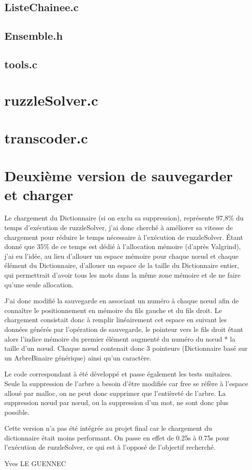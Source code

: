     \subsection{ListeChainee.c}
    \subsection{Ensemble.h}
    \subsection{tools.c}

  \section{ruzzleSolver.c}
  \section{transcoder.c}

\section{Deuxième version de sauvegarder et charger}
  Le chargement du Dictionnaire (si on exclu sa suppression), représente 97,8\%
  du temps d'exécution de ruzzleSolver, j'ai donc cherché à améliorer sa vitesse
  de chargement pour réduire le temps nécessaire à l'exécution de ruzzleSolver.
  Étant donné que 35\% de ce temps est dédié à l'allocation mémoire (d'après Valgrind),
  j'ai eu l'idée, au lieu d'allouer un espace mémoire pour chaque nœud et chaque
  élément du Dictionnaire, d'allouer un espace de la taille du Dictionnaire entier,
  qui permettrait d'avoir tous les mots dans la même zone mémoire et de ne faire qu'une
  seule allocation.

  J'ai donc modifié la sauvegarde en associant un numéro à chaque nœud afin de connaître
  le positionnement en mémoire du fils gauche et du fils droit.
  Le chargement consistait donc à remplir linéairement cet espace en suivant les données
  générés par l'opération de sauvegarde, le pointeur vers le fils droit étant alors
  l'indice mémoire du premier élément augmenté du numéro du nœud * la taille d'un nœud.
  Chaque nœud contenait donc 3 pointeurs (Dictionnaire basé sur un ArbreBinaire générique)
  ainsi qu'un caractère.

  Le code correspondant à été développé et passe également les tests unitaires.
  Seule la suppression de l'arbre a besoin d'être modifiée car free se réfère à l'espace
  alloué par malloc, on ne peut donc supprimer que l'entièreté de l'arbre.
  La suppression nœud par nœud, ou la suppression d'un mot, ne sont donc plus possible.

  Cette version n'a pas été intégrée au projet final car le chargement du dictionnaire était moins performant. On passe en effet de 0.25s à 0.75s pour l'exécution de ruzzleSolver, ce qui
  est à l'opposé de l'objectif recherché.

  Yves LE GUENNEC
